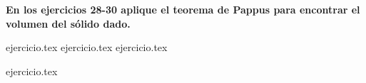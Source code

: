 \vspace{0.5cm}
\noindent\textbf{En los ejercicios 28-30 aplique el teorema de Pappus para encontrar el volumen del sólido dado.}
\begin{enumerate}
    \setcounter{enumi}{27}
    {ejercicio.tex}
{ejercicio.tex}
{ejercicio.tex}
\end{enumerate}

\vspace{0.5cm}
\begin{enumerate}
    \setcounter{enumi}{30}
    {ejercicio.tex}
\end{enumerate}
